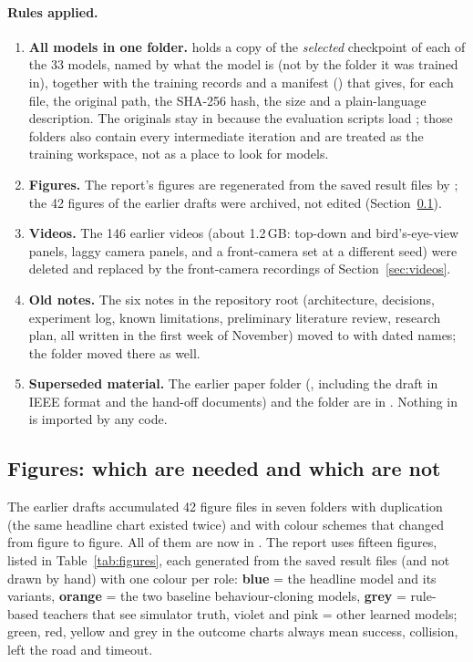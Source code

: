 \paragraph{Rules applied.}
\begin{enumerate}
\item \textbf{All models in one folder.}  holds a copy of the \emph{selected} checkpoint of each of the 33 models, named by what the model is (not by the folder it was trained in), together with
  the training records and a manifest () that gives, for each file, the original path, the SHA-256 hash, the size and a plain-language description. The originals stay in  because the evaluation scripts load
  ; those folders also contain every intermediate iteration and are treated as the training workspace, not as a place to look for models.
\item \textbf{Figures.} The report's figures are regenerated from the saved result files by ; the 42 figures of the earlier drafts were archived, not edited (Section~\ref{sec:figclean}).
\item \textbf{Videos.} The 146 earlier videos (about 1.2\,GB: top-down and bird's-eye-view panels, laggy camera panels, and a front-camera set at a different seed) were deleted and replaced by the front-camera recordings of Section~\ref{sec:videos}.
\item \textbf{Old notes.} The six notes in the repository root (architecture, decisions, experiment log, known limitations, preliminary literature review, research plan, all written in the first week of November) moved to 
  with dated names; the folder  moved there as well.
\item \textbf{Superseded material.} The earlier paper folder (, including the draft in IEEE format and the hand-off documents) and the folder  are in . Nothing in  is imported by any code.
\end{enumerate}

\subsection{Figures: which are needed and which are not}\label{sec:figclean}
The earlier drafts accumulated 42 figure files in seven folders with duplication (the same headline chart existed twice) and with colour schemes that changed from figure to figure.
All of them are now in . The report uses fifteen figures, listed in Table~\ref{tab:figures}, each generated from the saved result files (and not drawn by hand) with one colour per role:
\textcolor{headlineblue}{\textbf{blue}} = the headline model and its variants, \textcolor{baselineorange}{\textbf{orange}} = the two baseline behaviour-cloning models, \textcolor{ruleblack}{\textbf{grey}} = rule-based teachers that see simulator truth,
violet and pink = other learned models; green, red, yellow and grey in the outcome charts always mean success, collision, left the road and timeout.

